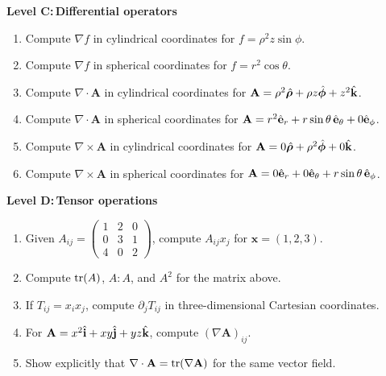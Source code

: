 \documentclass{otscience}
\begin{document}
\begin{practicebox}
    \textbf{Level C:\,Differential operators}
    \begin{enumerate}
        \item Compute \(\nabla f\) in cylindrical coordinates for \(f=\rho^2z\sin\phi\).
        \item Compute \(\nabla f\) in spherical coordinates for \(f=r^2\cos\theta\).
        \item Compute \(\nabla\cdot\mathbf{A}\) in cylindrical coordinates for \(\mathbf{A}=\rho^2\hat{\boldsymbol{\rho}}+\rho z\hat{\boldsymbol{\phi}}+z^2\hat{\mathbf{k}}\).
        \item Compute \(\nabla\cdot\mathbf{A}\) in spherical coordinates for \(\mathbf{A}=r^2\hat{\mathbf{e}}_r+r\sin\theta\,\hat{\mathbf{e}}_\theta+0\hat{\mathbf{e}}_\phi\).
        \item Compute \(\nabla\times\mathbf{A}\) in cylindrical coordinates for \(\mathbf{A}=0\hat{\boldsymbol{\rho}}+\rho^2\hat{\boldsymbol{\phi}}+0\hat{\mathbf{k}}\).
        \item Compute \(\nabla\times\mathbf{A}\) in spherical coordinates for \(\mathbf{A}=0\hat{\mathbf{e}}_r+0\hat{\mathbf{e}}_\theta+r\sin\theta\,\hat{\mathbf{e}}_\phi\).
    \end{enumerate}

    \textbf{Level D:\,Tensor operations}
    \begin{enumerate}
        \item Given \(A_{ij}=\begin{pmatrix}1&2&0\\0&3&1\\4&0&2\end{pmatrix}\), compute \(A_{ij}x_j\) for \(\mathbf{x}=(1,2,3)\).
        \item Compute \(\operatorname{tr}(A)\), \(A:A\), and \(A^2\) for the matrix above.
        \item If \(T_{ij}=x_{i}x_j\), compute \(\partial_{j}T_{ij}\) in three-dimensional Cartesian coordinates.
        \item For \(\mathbf{A}=x^2\hat{\mathbf{i}}+xy\hat{\mathbf{j}}+yz\hat{\mathbf{k}}\), compute \({(\nabla\mathbf{A})}_{ij}\).
        \item Show explicitly that \(\nabla\cdot\mathbf{A}=\operatorname{tr}(\nabla\mathbf{A})\) for the same vector field.
    \end{enumerate}
\end{practicebox}

\ifdefined\OTCOMBINED%
\else
\end{document}
